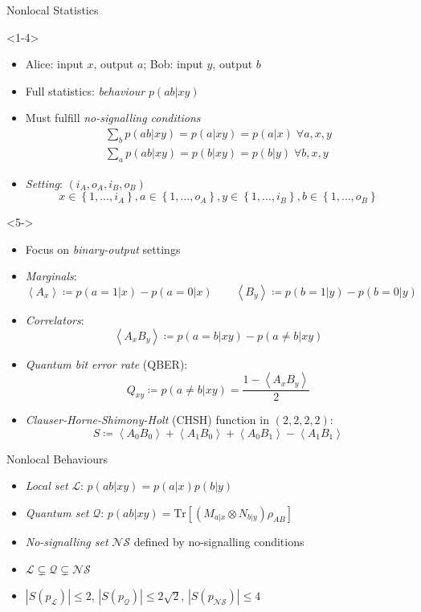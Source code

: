\documentclass[xcolor=dvipsnames]{beamer}
\newcommand{\?}{\mathrel{?}} %
\newcommand{\abs}[1]{\left\lvert#1\right\rvert} %
\newcommand{\dintv}[2]{\left\{#1,\ldots,#2\right\}}
\newcommand{\Tr}{\mathrm{Tr}} %
\newcommand{\angleb}[1]{\left\langle #1 \right\rangle} %
\newcommand{\Ls}{\mathcal{L}}
\newcommand{\Qs}{\mathcal{Q}}
\newcommand{\NSs}{\mathcal{NS}}
\begin{document}
\begin{frame}{Nonlocal Statistics}
  \begin{onlyenv}<1-4>
  \begin{itemize}[<+->]
    \item Alice: input \(x\), output \(a\); Bob: input \(y\), output \(b\)
    \item Full statistics: \emph{behaviour} \(p(ab|xy)\)
    \item Must fulfill \emph{no-signalling conditions}
      \begin{gather*}
        \sum_b p(ab|xy) = p(a|xy) = p(a|x)\;\forall a,x,y \\
        \sum_a p(ab|xy) = p(b|xy) = p(b|y)\;\forall b,x,y
      \end{gather*}
    \item \emph{Setting}: \((i_A, o_A, i_B, o_B)\)
    \[ x \in \dintv{1}{i_A}, a \in \dintv{1}{o_A}, y \in \dintv{1}{i_B}, b \in \dintv{1}{o_B} \]
  \end{itemize}
  \end{onlyenv}
  \begin{onlyenv}<5->
  \begin{itemize}[<+->]
    \item Focus on \emph{binary-output} settings
    \item \emph{Marginals}:
      \[ \angleb{A_x} \coloneqq p(a=1|x) - p(a=0|x) \qquad \angleb{B_y} \coloneqq p(b=1|y) - p(b=0|y) \]
    \item \emph{Correlators}:
      \[ \angleb{A_x B_y} \coloneqq p(a=b|xy) - p(a\neq b|xy) \]
    \item \emph{Quantum bit error rate} (QBER):
      \[ Q_{xy} \coloneqq p(a \neq b|xy) = \frac{1-\angleb{A_x B_y}}{2} \]
    \item \emph{Clauser-Horne-Shimony-Holt} (CHSH) function in \((2,2,2,2)\):
      \[ S \coloneqq \angleb{A_0 B_0} + \angleb{A_1 B_0} + \angleb{A_0 B_1} - \angleb{A_1 B_1} \]
  \end{itemize}
  \end{onlyenv}
\end{frame}

\begin{frame}{Nonlocal Behaviours}
  \begin{itemize}[<+->]
    \item \emph{Local set} \(\Ls\): \(p(ab|xy) = p(a|x)p(b|y)\)
    \item \emph{Quantum set} \(\Qs\): \(p(ab|xy) = \Tr\left[ \left(M_{a|x} \otimes N_{b|y}\right) \rho_{AB} \right]\)
    \item \emph{No-signalling set} \(\NSs\) defined by no-signalling conditions
    \item \(\Ls \subsetneq \Qs \subsetneq \NSs\)
    \item \(\abs{S(p_{\Ls})} \leq 2\), \(\abs{S(p_{\Qs})} \leq 2\sqrt{2}\), \(\abs{S(p_{\NSs})} \leq 4\)
  \end{itemize}
\end{frame}
\end{document}
